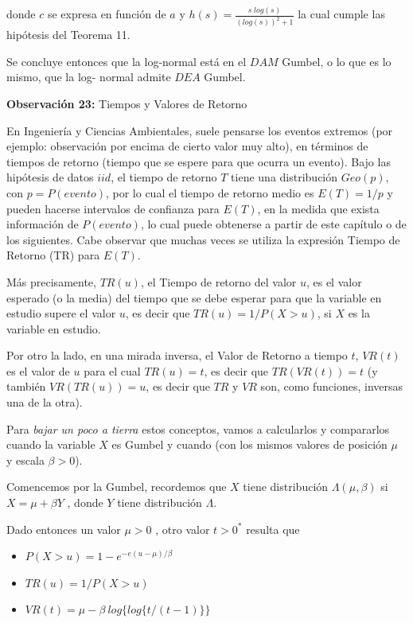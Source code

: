 \documentclass[
  oneside]{article}
\begin{document}
donde \(c\) se expresa en función de \(a\) y
\(h(s)=\frac{s\; log(s)}{(log(s))^2+1}\) la cual cumple las hipótesis
del Teorema 11.

Se concluye entonces que la log-normal está en el \(DAM\) Gumbel, o lo
que es lo mismo, que la log- normal admite \(DEA\) Gumbel.

\textbf{Observación 23:} Tiempos y Valores de Retorno

En Ingeniería y Ciencias Ambientales, suele pensarse los eventos
extremos (por ejemplo: observación por encima de cierto valor muy alto),
en términos de tiempos de retorno (tiempo que se espere para que ocurra
un evento). Bajo las hipótesis de datos \(iid\), el tiempo de retorno
\(T\) tiene una distribución \(Geo(p)\), con \(p = P(evento)\), por lo
cual el tiempo de retorno medio es \(E(T)=1/p\) y pueden hacerse
intervalos de confianza para \(E(T)\), en la medida que exista
información de \(P(evento)\), lo cual puede obtenerse a partir de este
capítulo o de los siguientes. Cabe observar que muchas veces se utiliza
la expresión Tiempo de Retorno (TR) para \(E(T)\).

Más precisamente, \(TR(u)\), el Tiempo de retorno del valor \(u\), es el
valor esperado (o la media) del tiempo que se debe esperar para que la
variable en estudio supere el valor \(u\), es decir que
\(TR(u) = 1/P(X>u)\), si \(X\) es la variable en estudio.

Por otro la lado, en una mirada inversa, el Valor de Retorno a tiempo
\(t\), \(VR(t)\) es el valor de \(u\) para el cual \(TR(u)=t\), es decir
que \(TR(VR(t))=t\) (y también \(VR(TR(u))=u\), es decir que \(TR\) y
\(VR\) son, como funciones, inversas una de la otra).

Para \textit{bajar un poco a tierra} estos conceptos, vamos a
calcularlos y compararlos cuando la variable \(X\) es Gumbel y cuando
(con los mismos valores de posición \(\mu\) y escala \(\beta>0\)).

Comencemos por la Gumbel, recordemos que \(X\) tiene distribución
\(\Lambda( \mu,\beta)\) si \(X= \mu+\beta Y\) , donde \(Y\) tiene
distribución \(\Lambda\).

Dado entonces un valor \(\mu>0\) , otro valor \(t>0^*\) resulta que

\begin{itemize}
\item $P(X>u)=1-e^{-e{(u-\mu)/ β }}$
\item $TR(u)=1/P(X>u)$
\item $VR(t)= \mu-\beta\: log\{log\{t/(t-1)\}\}$
\end{itemize}
\end{document}

